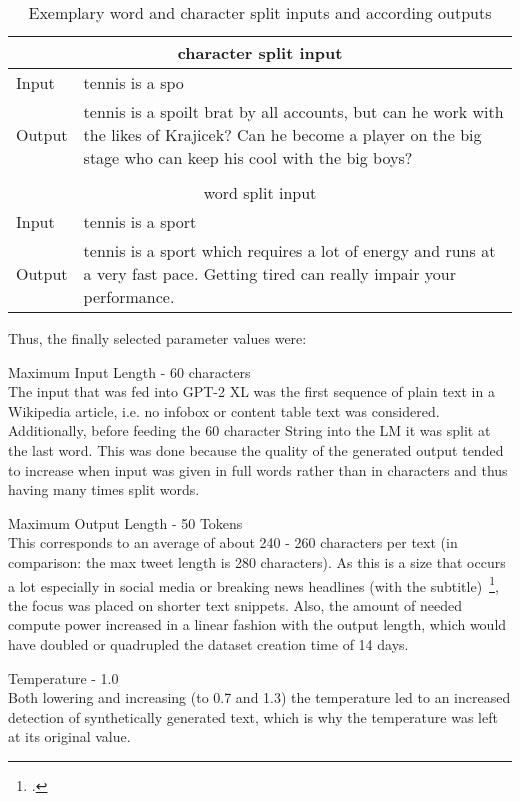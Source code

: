 \begin{table}
	\centering
		\begin{tabular}{ | l | p{14cm} | }
		\multicolumn{2}{c}{character split input} \\
		\hline
		Input & tennis is a spo \\ \hline
  		Output & tennis is a spoilt brat by all accounts, but can he work with the likes of Krajicek? Can he become a player on the big stage who can keep his cool with the big boys? \\
		\hline
  		\multicolumn{2}{c}{} \\
  		\multicolumn{2}{c}{word split input} \\
  		\hline			
  		Input & tennis is a sport \\ \hline
  		Output & tennis is a sport which requires a lot of energy and runs at a very fast pace. Getting tired can really impair your performance. \\
  		\hline
	\end{tabular}
	\caption{Exemplary word and character split inputs and according outputs} \label{tab:word_vs_char_split}
\end{table}

Thus, the finally selected parameter values were:

Maximum Input Length - 60 characters \\
The input that was fed into GPT-2 XL was the first sequence of plain text in a Wikipedia article, i.e. no infobox or content table text was 
considered. Additionally, before feeding the 60 character String into the LM it was split at the last word. This was done because the quality 
of the generated output tended to increase when input was given in full words rather than in characters and thus having many times split words.

Maximum Output Length - 50 Tokens \\
This corresponds to an average of about 240 - 260 characters per text (in comparison: the max tweet length is 280 characters). As this is a size that occurs a lot especially in social media or breaking news headlines (with the subtitle)~\footcite{lee2014proven}, the focus was placed on shorter text snippets. Also, the amount of needed compute power increased in a linear fashion with the output length, which would have doubled or quadrupled the dataset creation time of 14 days. 

Temperature - 1.0 \\
Both lowering and increasing (to 0.7 and 1.3) the temperature led to an increased detection of synthetically generated text, which is why the temperature was left at its original value.

